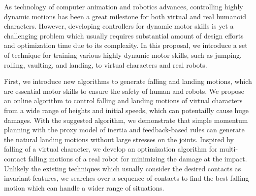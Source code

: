 \begin{summary}
  As technology of computer animation and robotics advances,
  controlling highly dynamic motions
  has been a great milestone for both virtual and real humanoid characters.
  However, developing controllers for dynamic motor skills is yet a challenging
  problem which usually requires substantial amount of design efforts and
  optimization time due to its complexity.
  In this proposal, we introduce a set of technique for training various
  highly dynamic motor skills, such as jumping, rolling, vaulting, and landing,
  to virtual characters and real robots.

  First, we introduce new algorithms to generate falling and landing motions,
  which are essential motor skills to ensure the safety of human and robots.
  We propose an online algorithm to control falling and landing motions 
  of virtual characters from a wide range of heights and initial speeds,
  which can potentailly cause huge damages.
  With the suggested algorithm, we demonstrate that simple momentum planning 
  with the proxy model of inertia and feedback-based rules can generate 
  the natural landing motions without large stresses on the joints.
  Inspired by falling of a virtual character, 
  we develop an optimization algorithm for multi-contact falling
  motions of a real robot for minimizing the damage at the impact.
  Unlikely the existing techniques which usually consider the desired contacts 
  as invariant features, we searches over a sequence of contacts to find
  the best falling motion which can handle a wider range of situations. 



\end{summary}
